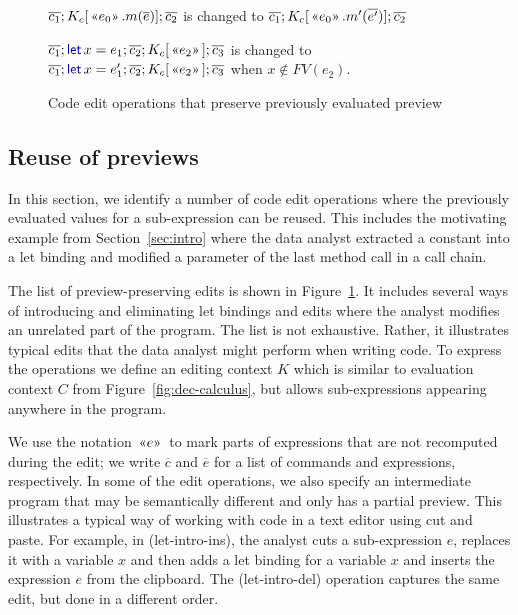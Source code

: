 \documentclass[english,submission]{programming}
\theoremstyle{plain}
\theoremstyle{definition}
\newcommand{\kvd}[1]{\textnormal{\textcolor{kvdclr}{\sffamily #1}}}
\newcommand{\rname}[1]{{\sffamily(#1)}}
\newcommand{\ername}[1]{\vspace{0.75em}\rname{#1}\hspace{0.5em}}
\newcommand{\preview}[1]{\,\textnormal{\guillemotleft} #1\textnormal{\guillemotright}\,}
\begin{document}
\begin{figure}[t]
\begin{minipage}[c]{0.868\textwidth}
  \ername{edit-mem}
  $\overline{c_1}; K_c[\preview{e_0}.m(\overline{e})]; \overline{c_2}$ is changed to
  $\overline{c_1}; K_c[\preview{e_0}.m'(\overline{e'})]; \overline{c_2}$

  \ername{edit-let}
  $\overline{c_1}; \kvd{let}\,x=e_1; \overline{c_2}; K_c[\preview{e_2}]; \overline{c_3}$ is changed to
  $\overline{c_1}; \kvd{let}\,x=e'_1; \overline{c_2}; K_c[\preview{e_2}]; \overline{c_3}$ \hspace{2em} when
  $x\notin FV(e_2)$.
\end{minipage}

\caption{Code edit operations that preserve previously evaluated preview}
\label{fig:operations}
\vspace{-0.5em}
\end{figure}


\subsection{Reuse of previews}
\label{sec:evaluation-reuse}

In this section, we identify a number of code edit operations where the previously evaluated
values for a sub-expression can be reused. This includes the motivating example from
Section~\ref{sec:intro} where the data analyst extracted a constant into a let binding and
modified a parameter of the last method call in a call chain.

The list of preview-preserving edits is shown in Figure~\ref{fig:operations}.
It includes several ways of introducing and eliminating let bindings and edits where the analyst
modifies an unrelated part of the program. The list is not exhaustive. Rather, it illustrates
typical edits that the data analyst might perform when writing code. To express the operations we
define an editing context $K$ which is similar to evaluation context $C$ from Figure~\ref{fig:dec-calculus},
but allows sub-expressions appearing anywhere in the program.

We use the notation $\preview{e}$ to mark parts of expressions that are not recomputed
during the edit; we write $\overline{c}$ and $\overline{e}$ for a list of commands and expressions,
respectively. In some of the edit operations, we also specify an intermediate program that may be
semantically different and only has a partial preview. This illustrates a typical way of
working with code in a text editor using cut and paste. For example, in
\rname{let-intro-ins}, the analyst cuts a sub-expression $e$, replaces it with
a variable $x$ and then adds a let binding for a variable $x$ and inserts the expression $e$
from the clipboard. The \rname{let-intro-del} operation captures the same edit, but
done in a different order.
\end{document}
